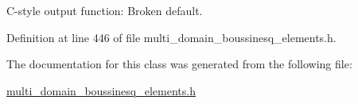 C-\/style output function\+: Broken default. 



Definition at line 446 of file multi\+\_\+domain\+\_\+boussinesq\+\_\+elements.\+h.



The documentation for this class was generated from the following file\+:\begin{DoxyCompactItemize}
\item 
\hyperlink{multi__domain__boussinesq__elements_8h}{multi\+\_\+domain\+\_\+boussinesq\+\_\+elements.\+h}\end{DoxyCompactItemize}

